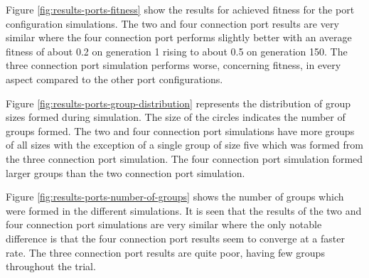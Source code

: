 \vspace*{\fill}


Figure \ref{fig:results-ports-fitness} show the results for achieved fitness for the port configuration simulations.
The two and four connection port results are very similar where the four connection port performs slightly better with an average fitness of about 0.2 on generation 1 rising to about 0.5 on generation 150. 
The three connection port simulation performs worse, concerning fitness, in every aspect compared to the other port configurations.

\vspace*{\fill}
\newpage
\vspace*{\fill}


Figure \ref{fig:results-ports-group-distribution} represents the distribution of group sizes formed during simulation.
The size of the circles indicates the number of groups formed.
The two and four connection port simulations have more groups of all sizes with the exception of a single group of size five which was formed from the three connection port simulation.
The four connection port simulation formed larger groups than the two connection port simulation.

\vspace*{\fill}
\newpage
\vspace*{\fill}


Figure \ref{fig:results-ports-number-of-groups} shows the number of groups which were formed in the different simulations.
It is seen that the results of the two and four connection port simulations are very similar where the only notable difference is that the four connection port results seem to converge at a faster rate.
The three connection port results are quite poor, having few groups throughout the trial.

